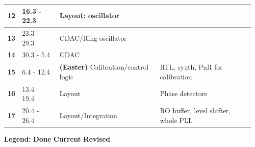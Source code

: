 \documentclass[t, screen, aspectratio=43]{beamer}
\begin{document}
\begin{frame}
\begin{table}[htb!]
\begin{tabular}{|c|l|l|l|}
			\hline 
			\rule[-1ex]{0pt}{2.5ex}\cellcolor{red!40}\textbf{12}&\cellcolor{red!40}16.3 - 22.3&\cellcolor{red!40}Layout: oscillator  &\cellcolor{red!40}\\ 
			\hline 
			\rule[-1ex]{0pt}{2.5ex}\cellcolor{red!40}\textbf{13}&\cellcolor{red!40}23.3 - 29.3&\cellcolor{red!40}CDAC/Ring oscillator   &\cellcolor{red!40}\\ 
			\hline 
			\rule[-1ex]{0pt}{2.5ex}\cellcolor{green!40}\textbf{14}&\cellcolor{green!40}30.3 - 5.4 &\cellcolor{green!40}CDAC &\cellcolor{green!40}\\ 
			\hline 
			\rule[-1ex]{0pt}{2.5ex}\textbf{15}& 6.4 - 12.4& {\color{red}\textbf{(Easter)}} Calibration/control logic & RTL, synth, PnR for calibration\\ 
			\hline 
			\rule[-1ex]{0pt}{2.5ex}\textbf{16}& 13.4 - 19.4& Layout & Phase detectors\\ 
			\hline 
			\rule[-1ex]{0pt}{2.5ex}\textbf{17}& 20.4 - 26.4& Layout/Integration & RO buffer, level shifter, whole PLL\\ 
			\hline 
		\end{tabular}
		\begin{flushleft}\textbf{Legend:} \colorbox{red!20}{\textbf{Done}} \colorbox{green!20}{\textbf{Current}}  \colorbox{blue!20}{\textbf{Revised}}
		\end{flushleft}
	\end{table}   
\end{frame}
\end{document}

